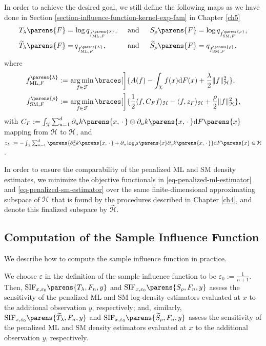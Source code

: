 In order to achieve the desired goal, we still define the following maps as we have done in Section \ref{section-influence-function-kernel-exp-fam} in Chapter \ref{ch5}
\begin{align*}
	T_{\lambda} \parens{F} = & \, \log q_{f_{\ML, F}^{\parens{\lambda}}}, && \, \text{ and } && \, S_{\rho} \parens{F} = \log q_{f_{\SM, F}^{\parens{\rho}}}, \\ 
	\widetilde{T}_{\lambda} \parens{F} = & \, q_{f_{\ML, F}^{\parens{\lambda}}}, && \, \text{ and } && \, \widetilde{S}_{\rho} \parens{F} = q_{f_{\SM, F}^{\parens{\rho}}}, 
\end{align*}
where 
\begin{align}
	f_{\ML, F}^{\parens{\lambda}} := & \, \argmin_{f \in \calF} \braces[\bigg]{A (f) - \int_{\mathcal{X}} f (x) \mathrm{d} F (x) + \frac{\lambda}{2} \Vert f \Vert_{\mathcal{H}}^2}, \label{eq-penalized-ml-estimator} \\ 
	f_{\SM, F}^{\parens{\rho}} := & \, \argmin_{f \in \calF} \braces[\bigg]{\frac{1}{2} \langle f, C_{F} f \rangle_{\mathcal{H}} - \langle f, z_{F} \rangle_{\mathcal{H}} + \frac{\rho}{2} \Vert f \Vert_{\mathcal{H}}^2}, \label{eq-penalized-sm-estimator}
\end{align}
with $C_F := \int_{\calX} \sum_{u=1}^d \partial_u k \parens{x, \,\cdot\,} \otimes \partial_u k \parens{x, \,\cdot\,} \diff F \parens{x}$ mapping from $\mathcal{H}$ to $\mathcal{H}$, and $z_F := - \int_{\calX} \sum_{u=1}^d \parens{ \partial_u^2 k \parens{x, \,\cdot\,} + \partial_u \log \mu \parens{x} \partial_u k \parens{x, \,\cdot\,}} \diff F \parens{x} \in \calH$. 

In order to ensure the comparability of the penalized ML and SM density estimates, we minimize the objective functionals in \eqref{eq-penalized-ml-estimator} and \eqref{eq-penalized-sm-estimator} over the same finite-dimensional approximating subspace of $\mathcal{H}$ that is found by the procedures described in Chapter \ref{ch4}, and denote this finalized subspace by $\widetilde{\mathcal{H}}$. 

\subsection{Computation of the Sample Influence Function}\label{subsection-computation-sample-inf-fun}

We describe how to compute the sample influence function in practice. 

We choose $\varepsilon$ in the definition of the sample influence function to be $\varepsilon_0 := \frac{1}{n+1}$. Then, $\mathrm{SIF}_{x, \varepsilon_0} \parens{T_{\lambda}, F_n, y}$ and $\mathrm{SIF}_{x, \varepsilon_0} \parens{S_{\rho}, F_n, y}$ assess the sensitivity of the penalized ML and SM log-density estimators evaluated at $x$ to the additional observation $y$, respectively; and, similarly, $\mathrm{SIF}_{x, \varepsilon_0} \parens{\widetilde{T}_{\lambda}, F_n, y}$ and $\mathrm{SIF}_{x, \varepsilon_0} \parens{\widetilde{S}_{\rho}, F_n, y}$ assess the sensitivity of the penalized ML and SM density estimators evaluated at $x$ to the additional observation $y$, respectively. 

